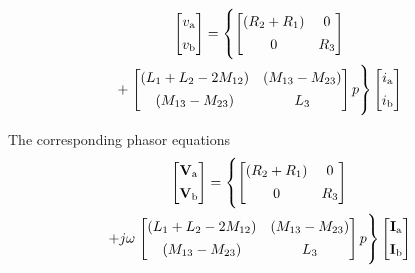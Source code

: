 \documentclass[a4paper,numbers=noenddot,12pt]{scrbook}
\begin{document}
        \begin{multline*}
            \begin{bmatrix}
                v_{\textup{a}} \\[1ex] v_{\textup{b}}
            \end{bmatrix}
            = \left\{ 
                \begin{bmatrix}
                    (R_2 + R_1) & 0 \\[1ex] 0 & R_3
                \end{bmatrix} 
                \right.
                \\
                +
                \left.
                \begin{bmatrix}
                    (L_1 + L_2 - 2 M_{12}) & (M_{13} - M_{23}) \\[1ex]
                    (M_{13} - M_{23}) & L_3
                \end{bmatrix}
                p
            \right\}
            \begin{bmatrix}
                i_{\textup{a}} \\[1ex] i_{\textup{b}}
            \end{bmatrix}
        \end{multline*}

        The corresponding phasor equations
        \begin{multline*}
            \begin{bmatrix}
                \mathbf{V}_{\textup{a}} \\[1ex] \mathbf{V}_{\textup{b}}
            \end{bmatrix}
            = \left\{ 
                \begin{bmatrix}
                    (R_2 + R_1) & 0 \\[1ex] 0 & R_3
                \end{bmatrix} 
                \right.
                \\
                + j \omega
                \left.
                \begin{bmatrix}
                    (L_1 + L_2 - 2 M_{12}) & (M_{13} - M_{23}) \\[1ex]
                    (M_{13} - M_{23}) & L_3
                \end{bmatrix}
                p
            \right\}
            \begin{bmatrix}
                \mathbf{I}_{\textup{a}} \\[1ex] \mathbf{I}_{\textup{b}}
            \end{bmatrix}
        \end{multline*}
\end{document}
